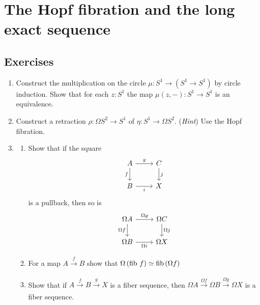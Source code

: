 \documentclass[10pt,oneside,leqno,openright]{memoir}
\begin{document}
\chapter[The Hopf fibration and the LES]{The Hopf fibration and the long exact sequence}



\section{Exercises}
\begin{enumerate}
\item Construct the multiplication on the circle $\mu : S^1 \to (S^1 \to S^1)$ by circle induction. Show that for each $z : S^1$ the map $\mu (z , -) : S^1 \to S^1$ is an equivalence.

\item Construct a retraction $\rho : \Omega S^2 \to S^1$ of $\eta : S^1 \to \Omega S^2$.
  (\emph{Hint}) Use the Hopf fibration.

  \item \begin{enumerate}[label=(\roman*)]
    \item Show that if the square
    \[
    \begin{tikzcd}
      A \ar[d,"f"']\ar[r,"g"] & C\ar[d,"{j}"] \\
      B\ar[r,"{i}"'] & X
    \end{tikzcd}
  \]
is a pullback, then so is
\[
    \begin{tikzcd}
      \Omega A \ar[d,"\Omega f"']\ar[r,"\Omega g"] & \Omega C\ar[d,"{\Omega j}"] \\ 
      \Omega B\ar[r,"{\Omega i}"'] & \Omega X
    \end{tikzcd}
  \]
  \item For a map $A \xrightarrow[]{f}B$ show that $\Omega \, (\operatorname{fib} \,f) \simeq \operatorname{fib} \, (\Omega f)$
  \item Show that if $A \xrightarrow[]{f} B \xrightarrow[]{g}X$ is a fiber sequence, then $\Omega A \xrightarrow[]{\Omega f} \Omega B \xrightarrow[]{\Omega g} \Omega X$ is a fiber sequence.
\end{enumerate}


\end{enumerate}
\end{document}
